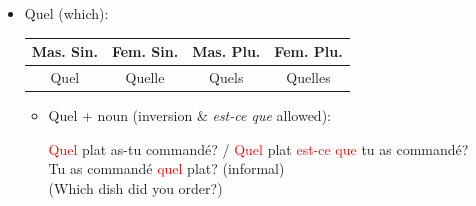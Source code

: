 \documentclass{book}
\begin{document}
\begin{itemize}
\begin{enumerate}
\begin{enumerate}
                            \item De quoi \dots / De quoi est-ce que \dots / \dots de quoi? (informal):
                                \begin{center}
                                    De quoi parles-tu? / De quoi est-ce que tu parles? \\
                                    Tu parles de quoi? (informal) \\
                                    (What are you talking about?)
                                \end{center}

                            \item Avec quoi \dots / Avec quoi est-ce que \dots / \dots avec quoi? (informal):
                                \begin{center}
                                    Avec quoi est-ce que tu écris? / Avec quoi écris-tu? \\
                                    Tu écris avec quoi? (informal) \\
                                    (What are you writing with?)
                                \end{center}
                        \end{enumerate}
                \end{enumerate}

            \item Quel (which):
                \begin{center}
                    \begin{tabular}{|c|c|c|c|}
                        \hline
                        \textbf{Mas. Sin.} & \textbf{Fem. Sin.} & \textbf{Mas. Plu.} & \textbf{Fem. Plu.}\\
                        \hline
                        Quel & Quelle & Quels & Quelles \\
                        \hline
                    \end{tabular}
                \end{center}

                \begin{itemize}
                    \item Quel + noun (inversion \& \textit{est-ce que} allowed):
                        \begin{center}
                            \textcolor{red}{Quel} plat as-tu commandé? / \textcolor{red}{Quel} plat \textcolor{red}{est-ce que} tu as commandé? \\
                            Tu as commandé \textcolor{red}{quel} plat? (informal) \\
                            (Which dish did you order?)
                        \end{center}


\end{itemize}
\end{itemize}
\end{document}

